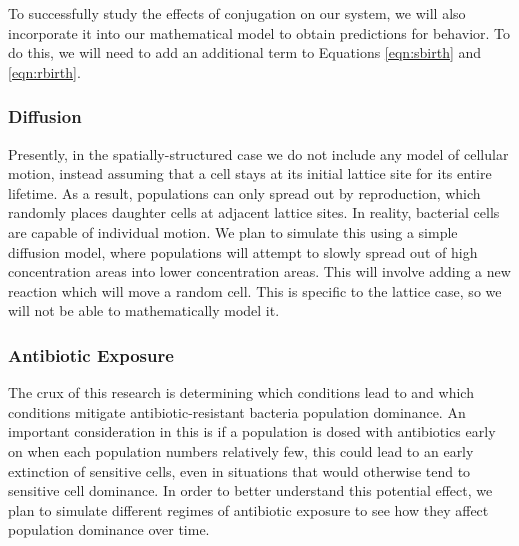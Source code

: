 \documentclass[numbib]{buthesis_p}  %
\begin{document}
To successfully study the effects of conjugation on our system, we will also
incorporate it into our mathematical model to obtain predictions for behavior.
To do this, we will need to add an additional term to Equations \ref{eqn:sbirth}
and \ref{eqn:rbirth}. %

\subsubsection{Diffusion}
Presently, in the spatially-structured case we do not include any model of
cellular motion, instead assuming that a cell stays at its initial lattice site
for its entire lifetime. As a result, populations can only spread out by reproduction,
which randomly places daughter cells at adjacent lattice sites. In reality,
bacterial cells are capable of individual motion. We plan to simulate
this using a simple diffusion model, where populations will attempt to slowly spread
out of high concentration areas into lower concentration areas. This will involve
adding a new reaction which will move a random cell. This is specific to the
lattice case, so we will not be able to mathematically model it. %

\subsubsection{Antibiotic Exposure}
The crux of this research is determining which conditions lead to and which conditions mitigate
antibiotic-resistant bacteria population dominance. An important consideration
in this is if a population is dosed with antibiotics early on when each
population numbers relatively few, this could lead to an early extinction of
sensitive cells, even in situations that would otherwise tend to sensitive
cell dominance. In order to better understand this potential effect, we plan to
simulate different regimes of antibiotic exposure to see how they affect population
dominance over time. %
\end{document}
